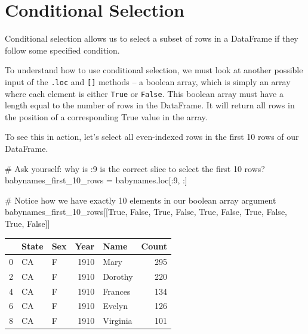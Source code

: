 \documentclass[
  letterpaper,
  DIV=11,
  numbers=noendperiod]{scrreprt}
\newenvironment{Shaded}{\begin{snugshade}}{\end{snugshade}}
\newcommand{\CommentTok}[1]{\textcolor[rgb]{0.37,0.37,0.37}{#1}}
\newcommand{\DecValTok}[1]{\textcolor[rgb]{0.68,0.00,0.00}{#1}}
\newcommand{\NormalTok}[1]{\textcolor[rgb]{0.00,0.23,0.31}{#1}}
\newcommand{\OperatorTok}[1]{\textcolor[rgb]{0.37,0.37,0.37}{#1}}
\newcommand{\VariableTok}[1]{\textcolor[rgb]{0.07,0.07,0.07}{#1}}
\begin{document}
\hypertarget{conditional-selection}{%
\section{Conditional Selection}\label{conditional-selection}}

Conditional selection allows us to select a subset of rows in a
DataFrame if they follow some specified condition.

To understand how to use conditional selection, we must look at another
possible input of the \texttt{.loc} and \texttt{{[}{]}} methods -- a
boolean array, which is simply an array where each element is either
\texttt{True} or \texttt{False}. This boolean array must have a length
equal to the number of rows in the DataFrame. It will return all rows in
the position of a corresponding True value in the array.

To see this in action, let's select all even-indexed rows in the first
10 rows of our DataFrame.

\begin{Shaded}
\begin{Highlighting}[]
\CommentTok{\# Ask yourself: why is :9 is the correct slice to select the first 10 rows?}
\NormalTok{babynames\_first\_10\_rows }\OperatorTok{=}\NormalTok{ babynames.loc[:}\DecValTok{9}\NormalTok{, :]}

\CommentTok{\# Notice how we have exactly 10 elements in our boolean array argument}
\NormalTok{babynames\_first\_10\_rows[[}\VariableTok{True}\NormalTok{, }\VariableTok{False}\NormalTok{, }\VariableTok{True}\NormalTok{, }\VariableTok{False}\NormalTok{, }\VariableTok{True}\NormalTok{, }\VariableTok{False}\NormalTok{, }\VariableTok{True}\NormalTok{, }\VariableTok{False}\NormalTok{, }\VariableTok{True}\NormalTok{, }\VariableTok{False}\NormalTok{]]}
\end{Highlighting}
\end{Shaded}

\begin{tabular}{lllrlr}
\toprule
{} & State & Sex &  Year &      Name &  Count \\
\midrule
0 &    CA &   F &  1910 &      Mary &    295 \\
2 &    CA &   F &  1910 &   Dorothy &    220 \\
4 &    CA &   F &  1910 &   Frances &    134 \\
6 &    CA &   F &  1910 &    Evelyn &    126 \\
8 &    CA &   F &  1910 &  Virginia &    101 \\
\bottomrule
\end{tabular}
\end{document}
